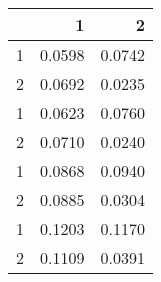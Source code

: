 \begin{tabular}{lrr}
\toprule
{} &       1 &       2 \\
\midrule
1 &  0.0598 &  0.0742 \\
2 &  0.0692 &  0.0235 \\
1 &  0.0623 &  0.0760 \\
2 &  0.0710 &  0.0240 \\
1 &  0.0868 &  0.0940 \\
2 &  0.0885 &  0.0304 \\
1 &  0.1203 &  0.1170 \\
2 &  0.1109 &  0.0391 \\
\bottomrule
\end{tabular}
